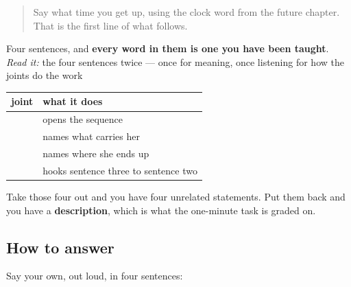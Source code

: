 \label{lesson:HI-C90-sintesis-dincharya}



\begin{quote}
Say what time you get up, using the clock word from the future chapter. That is the first line of what follows.
\end{quote}

\begin{tcolorbox}[breakable,skin=enhanced,colback=orange!6,colframe=orange!45!black,boxrule=0.5pt,arc=1mm,left=6pt,right=6pt,top=4pt,bottom=4pt,fonttitle=\bfseries,title={Read this}]
\begin{quote}
                          
\end{quote}

Four sentences, and \textbf{every word in them is one you have been taught}. \emph{Read it:} the four sentences twice — once for meaning, once listening for how the joints do the work
\end{tcolorbox}

\begin{grammarlens}[title={Grammar Lens: what is holding it together}]
\noindent
\begin{tabularx}{\linewidth}{@{}>{\raggedright\arraybackslash}X>{\raggedright\arraybackslash}X@{}}
\toprule
\textbf{joint} & \textbf{what it does} \\
\midrule
\hi{पहले} & opens the sequence \\
\hi{से} & names what carries her \\
\hi{पर} & names where she ends up \\
\hi{के} \hi{बाद} & hooks sentence three to sentence two \\
\bottomrule
\end{tabularx}

Take those four out and you have four unrelated statements. Put them back and you have a \textbf{description}, which is what the one-minute task is graded on.
\end{grammarlens}

\subsection*{How to answer}
Say your own, out loud, in four sentences:

